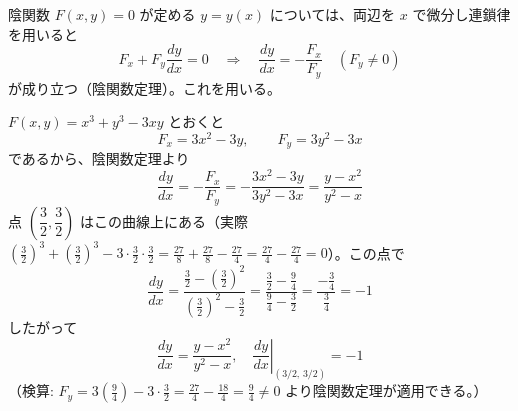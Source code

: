 
陰関数 $F(x,y)=0$ が定める $y=y(x)$ については、両辺を $x$ で微分し連鎖律を用いると
\[
F_{x} + F_{y}\frac{dy}{dx} = 0 \quad\Longrightarrow\quad \frac{dy}{dx} = -\frac{F_{x}}{F_{y}} \quad (F_{y} \ne 0)
\]
が成り立つ（陰関数定理）。これを用いる。

$F(x,y) = x^{3} + y^{3} - 3xy$ とおくと
\[
F_{x} = 3x^{2} - 3y, \qquad F_{y} = 3y^{2} - 3x
\]
であるから、陰関数定理より
\[
\frac{dy}{dx} = -\frac{F_{x}}{F_{y}} = -\frac{3x^{2}-3y}{3y^{2}-3x} = \frac{y-x^{2}}{y^{2}-x}
\]
点 $\left(\dfrac{3}{2},\dfrac{3}{2}\right)$ はこの曲線上にある（実際 $\left(\tfrac{3}{2}\right)^{3}+\left(\tfrac{3}{2}\right)^{3}-3\cdot\tfrac{3}{2}\cdot\tfrac{3}{2} = \tfrac{27}{8}+\tfrac{27}{8}-\tfrac{27}{4} = \tfrac{27}{4}-\tfrac{27}{4}=0$）。この点で
\[
\frac{dy}{dx} = \frac{\frac{3}{2} - \left(\frac{3}{2}\right)^{2}}{\left(\frac{3}{2}\right)^{2} - \frac{3}{2}} = \frac{\frac{3}{2}-\frac{9}{4}}{\frac{9}{4}-\frac{3}{2}} = \frac{-\frac{3}{4}}{\frac{3}{4}} = -1
\]
したがって
\[
\boxed{\; \frac{dy}{dx} = \frac{y-x^{2}}{y^{2}-x}, \quad \left.\frac{dy}{dx}\right|_{(3/2,\,3/2)} = -1 \;}
\]
（検算: $F_y = 3\left(\tfrac{9}{4}\right)-3\cdot\tfrac{3}{2} = \tfrac{27}{4}-\tfrac{18}{4}=\tfrac{9}{4}\ne 0$ より陰関数定理が適用できる。）
